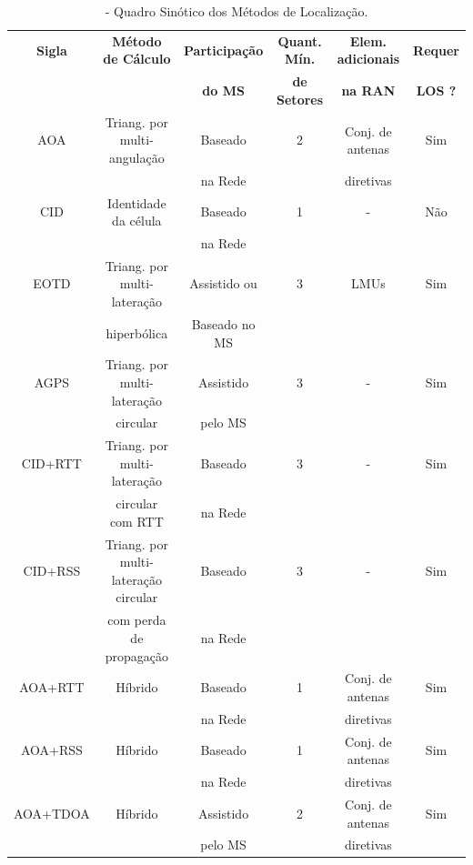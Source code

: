 \begin{table}[ht]
\centering
\caption{\label{tab:quadrosinotico}- Quadro Sinótico dos Métodos de Localização.}
\vspace*{.1cm}
\begin{scriptsize}
\begin{tabular}{|c|c|c|c|c|c|}
\hline
\textbf{Sigla} & \textbf{Método de Cálculo} & \textbf{Participação} & \textbf{Quant. Mín.} & \textbf{Elem. adicionais} & \textbf{Requer}\\
& & \textbf{do MS} & \textbf{de Setores} & \textbf{na RAN} & \textbf{LOS ?}\\
\hline
AOA	& Triang. por multi-angulação & Baseado & 2	& Conj. de antenas & Sim \\
& & na Rede & & diretivas & \\
\hline
CID	& Identidade da célula	& Baseado & 1	& - & Não\\
& & na Rede & & & \\
\hline
EOTD	& Triang. por multi-lateração &	Assistido ou &	3	& LMUs & Sim \\
& hiperbólica & Baseado no MS & & & \\
\hline
AGPS	& Triang. por multi-lateração & Assistido & 3 & - & Sim \\
& circular & pelo MS & & & \\
\hline
CID+RTT	& Triang. por multi-lateração &	Baseado & 3	& - & Sim \\
& circular com RTT & na Rede & & & \\
\hline
CID+RSS	& Triang. por multi-lateração circular  &	Baseado & 3	& - & Sim \\
& com perda de propagação & na Rede & & & \\
\hline
AOA+RTT	& Híbrido	& Baseado & 1	&  Conj. de antenas & Sim \\
& & na Rede & & diretivas & \\
\hline
AOA+RSS	& Híbrido	& Baseado & 1	&  Conj. de antenas & Sim \\
& & na Rede & & diretivas& \\
\hline
AOA+TDOA	& Híbrido	& Assistido & 2	&  Conj. de antenas & Sim \\
& & pelo MS & & diretivas& \\
\hline
\end{tabular}
\end{scriptsize}
\vspace*{-.2cm}
\end{table}


